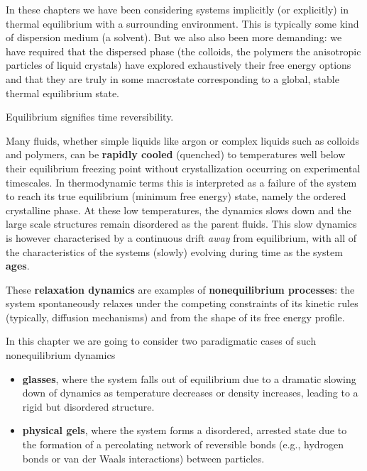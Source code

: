 \documentclass[
  letterpaper,
  enabledeprecatedfontcommands]{report}
\providecommand{\tightlist}{%
  \setlength{\itemsep}{0pt}\setlength{\parskip}{0pt}}
\begin{document}
In these chapters we have been considering systems implicitly (or
explicitly) in thermal equilibrium with a surrounding environment. This
is typically some kind of dispersion medium (a solvent). But we also
also been more demanding: we have required that the dispersed phase (the
colloids, the polymers the anisotropic particles of liquid crystals)
have explored exhaustively their free energy options and that they are
truly in some macrostate corresponding to a global, stable thermal
equilibrium state.

Equilibrium signifies time reversibility.


Many fluids, whether simple liquids like argon or complex liquids such
as colloids and polymers, can be \textbf{rapidly cooled} (quenched) to
temperatures well below their equilibrium freezing point without
crystallization occurring on experimental timescales. In thermodynamic
terms this is interpreted as a failure of the system to reach its true
equilibrium (minimum free energy) state, namely the ordered crystalline
phase. At these low temperatures, the dynamics slows down and the large
scale structures remain disordered as the parent fluids. This slow
dynamics is however characterised by a continuous drift \emph{away} from
equilibrium, with all of the characteristics of the systems (slowly)
evolving during time as the system \textbf{ages}.

These \textbf{relaxation dynamics} are examples of
\textbf{nonequilibrium processes}: the system spontaneously relaxes
under the competing constraints of its kinetic rules (typically,
diffusion mechanisms) and from the shape of its free energy profile.

In this chapter we are going to consider two paradigmatic cases of such
nonequilibrium dynamics

\begin{itemize}
\tightlist
\item
  \textbf{glasses}, where the system falls out of equilibrium due to a
  dramatic slowing down of dynamics as temperature decreases or density
  increases, leading to a rigid but disordered structure.
\item
  \textbf{physical gels}, where the system forms a disordered, arrested
  state due to the formation of a percolating network of reversible
  bonds (e.g., hydrogen bonds or van der Waals interactions) between
  particles.
\end{itemize}
\end{document}
